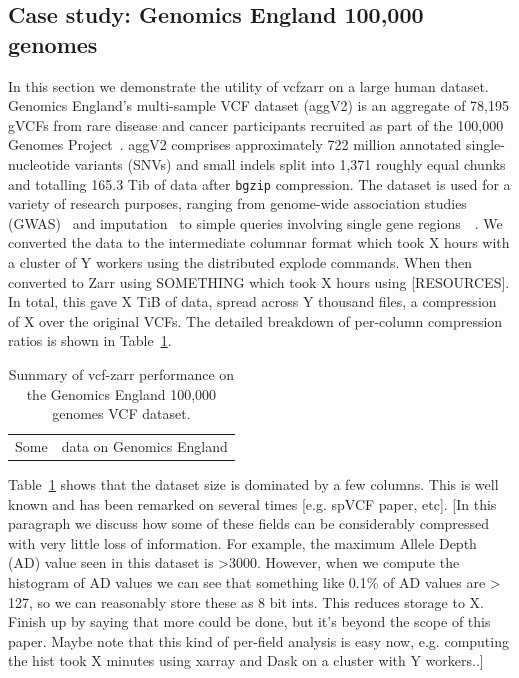 \documentclass[a4paper,num-refs]{oup-contemporary}
\begin{document}
\subsection{Case study: Genomics England 100,000 genomes}
In this section we demonstrate the utility of vcfzarr on a large human dataset.
Genomics England’s multi-sample VCF dataset (aggV2) is an 
aggregate of 78,195 gVCFs from rare disease and cancer participants 
recruited as part of the 100,000 Genomes Project~\cite{turnbull2018100}. 
aggV2 comprises approximately 722 million annotated single-nucleotide 
variants (SNVs) and small indels split into 1,371 roughly equal chunks and 
totalling 165.3 Tib of data after \texttt{bgzip} compression. 
The dataset is used for a variety of research purposes, ranging from 
genome-wide association studies (GWAS)~\cite{kousathanas2022whole} and 
imputation~\cite{shi2023genomics} to 
simple queries involving single gene 
regions~\cite{leggatt2023genotype}~\cite{lam2023repeat}.
We converted the data to the intermediate columnar format 
which took X hours with a cluster of Y workers using the 
distributed explode commands. When then converted to Zarr using 
SOMETHING which took X hours using [RESOURCES]. In total, this gave 
X TiB of data, spread across Y thousand files, a compression of 
X over the original VCFs.
The detailed breakdown of per-column compression ratios is 
shown in Table~\ref{tab-genomics-england-data}.

\begin{table}
\begin{tabular}{cc}
Some & data on Genomics England\\
\end{tabular}
\caption{Summary of vcf-zarr performance on the Genomics England 100,000
genomes VCF dataset.
\label{tab-genomics-england-data}}
\end{table}

Table~\ref{tab-genomics-england-data} shows that the dataset size is 
dominated by a few columns. This is well known and has been remarked 
on several times [e.g. spVCF paper, etc]. [In this paragraph we discuss
how some of these fields can be considerably compressed with very
little loss of information. For example, the maximum Allele Depth (AD)
value seen in this dataset is >3000. However, when we compute the 
histogram of AD values we can see that something like 0.1\% of 
AD values are > 127, so we can reasonably store these as 8 bit 
ints. This reduces storage to X. Finish up by saying that more 
could be done, but it's beyond the scope of this paper. Maybe note 
that this kind of per-field analysis is easy now, e.g. computing 
the hist took X minutes using xarray and Dask on a cluster with
Y workers..]
\end{document}
